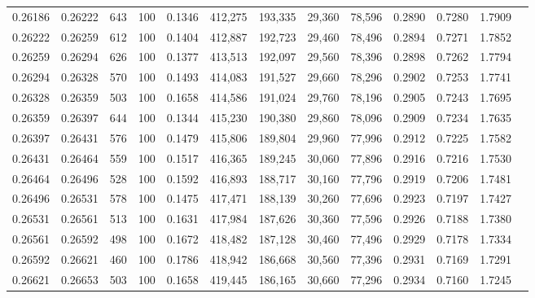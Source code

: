 \begin{tabular}{rrrrrrrrrrrrr}
0.26186 & 0.26222 &   643 & 100 &                                     0.1346 & 412,275 & 193,335 &  29,360 &  78,596 & 0.2890 & 0.7280 & 1.7909 \\
0.26222 & 0.26259 &   612 & 100 &                                     0.1404 & 412,887 & 192,723 &  29,460 &  78,496 & 0.2894 & 0.7271 & 1.7852 \\
0.26259 & 0.26294 &   626 & 100 &                                     0.1377 & 413,513 & 192,097 &  29,560 &  78,396 & 0.2898 & 0.7262 & 1.7794 \\
0.26294 & 0.26328 &   570 & 100 &                                     0.1493 & 414,083 & 191,527 &  29,660 &  78,296 & 0.2902 & 0.7253 & 1.7741 \\
0.26328 & 0.26359 &   503 & 100 &                                     0.1658 & 414,586 & 191,024 &  29,760 &  78,196 & 0.2905 & 0.7243 & 1.7695 \\
0.26359 & 0.26397 &   644 & 100 &                                     0.1344 & 415,230 & 190,380 &  29,860 &  78,096 & 0.2909 & 0.7234 & 1.7635 \\
0.26397 & 0.26431 &   576 & 100 &                                     0.1479 & 415,806 & 189,804 &  29,960 &  77,996 & 0.2912 & 0.7225 & 1.7582 \\
0.26431 & 0.26464 &   559 & 100 &                                     0.1517 & 416,365 & 189,245 &  30,060 &  77,896 & 0.2916 & 0.7216 & 1.7530 \\
0.26464 & 0.26496 &   528 & 100 &                                     0.1592 & 416,893 & 188,717 &  30,160 &  77,796 & 0.2919 & 0.7206 & 1.7481 \\
0.26496 & 0.26531 &   578 & 100 &                                     0.1475 & 417,471 & 188,139 &  30,260 &  77,696 & 0.2923 & 0.7197 & 1.7427 \\
0.26531 & 0.26561 &   513 & 100 &                                     0.1631 & 417,984 & 187,626 &  30,360 &  77,596 & 0.2926 & 0.7188 & 1.7380 \\
0.26561 & 0.26592 &   498 & 100 &                                     0.1672 & 418,482 & 187,128 &  30,460 &  77,496 & 0.2929 & 0.7178 & 1.7334 \\
0.26592 & 0.26621 &   460 & 100 &                                     0.1786 & 418,942 & 186,668 &  30,560 &  77,396 & 0.2931 & 0.7169 & 1.7291 \\
0.26621 & 0.26653 &   503 & 100 &                                     0.1658 & 419,445 & 186,165 &  30,660 &  77,296 & 0.2934 & 0.7160 & 1.7245 \\

\end{tabular}
